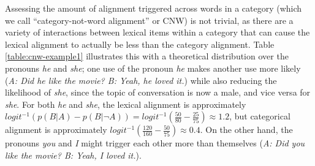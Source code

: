 \documentclass[11pt]{article}
\begin{document}
Assessing the amount of alignment triggered across words in a category (which we call ``category-not-word alignment'' or CNW) is not trivial, as there are a variety of interactions between lexical items within a category that can cause the lexical alignment to actually be less than the category alignment. Table \ref{table:cnw-example1} illustrates this with a theoretical distribution over the pronouns \textit{he} and \textit{she}; one use of the pronoun \textit{he} makes another use more likely (\textit{A: Did he like the movie? B: Yeah, he loved it.}) while also reducing the likelihood of \textit{she}, since the topic of conversation is now a male, and vice versa for \textit{she}. For both \textit{he} and \textit{she}, the lexical alignment is approximately $logit^{-1}(p(B|A)-p(B|\neg A)) = logit^{-1}(\frac{50}{80}-\frac{25}{75}) \approx 1.2$,
but categorical alignment is approximately $logit^{-1}(\frac{120}{160}-\frac{50}{75}) \approx 0.4$. On the other hand, the pronouns \textit{you} and \textit{I} might trigger each other more than themselves (\textit{A: Did you like the movie? B: Yeah, I loved it.}).





\end{document}
